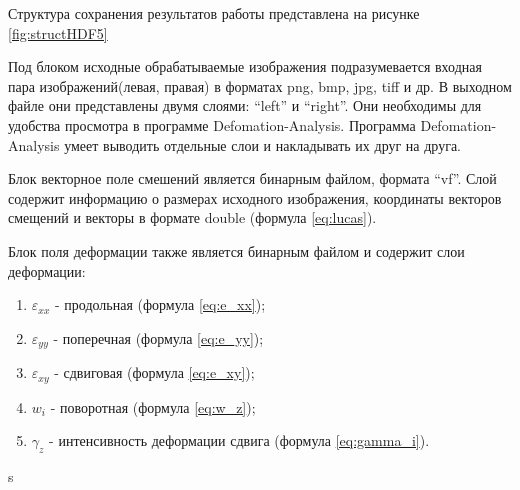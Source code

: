 Структура сохранения результатов работы представлена на рисунке \ref{fig:structHDF5}

Под блоком исходные обрабатываемые изображения подразумевается входная пара изображений(левая, правая) в форматах png, bmp, jpg, tiff и др. В выходном файле они представлены двумя слоями: ``left'' и ``right''. Они необходимы для удобства просмотра в программе Defomation-Analysis. Программа Defomation-Analysis умеет выводить отдельные слои и накладывать их друг на друга.

Блок векторное поле смешений является бинарным файлом, формата ``vf''. Слой содержит информацию о размерах исходного изображения, координаты векторов смещений и векторы в формате double (формула \ref{eq:lucas}).

Блок поля деформации также является бинарным файлом и содержит слои деформации:
\begin{enumerate}
\item $\varepsilon_{xx}$ - продольная (формула \ref{eq:e_xx});
\item $\varepsilon_{yy}$ - поперечная (формула \ref{eq:e_yy});
\item $\varepsilon_{xy}$ - сдвиговая (формула \ref{eq:e_xy});
\item $w_{i}$ - поворотная (формула \ref{eq:w_z});
\item $\gamma_z$ - интенсивность деформации сдвига (формула \ref{eq:gamma_i}).
\end{enumerate}s